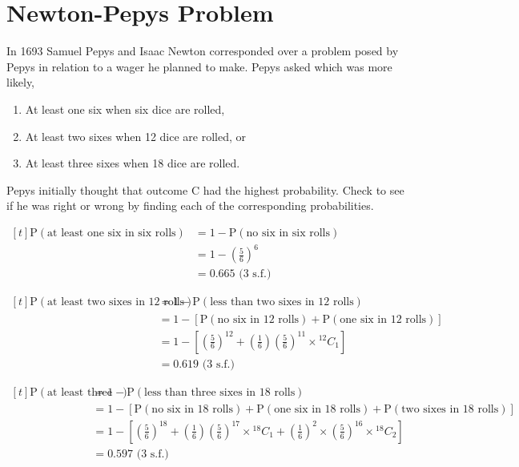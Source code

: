 \documentclass[11pt,a4paper]{book}
\begin{document}
\section{Newton-Pepys Problem}

\begin{example}

In 1693 Samuel Pepys and Isaac Newton corresponded over a problem
posed by Pepys in relation to a wager he planned to make. Pepys asked
which was more likely,

\begin{enumerate}[label=\Alph*:]

\item At least one six when six dice are rolled,

\item At least two sixes when 12 dice are rolled, or

\item At least three sixes when 18 dice are rolled.

\end{enumerate}

Pepys initially thought that outcome C had the highest probability.
Check to see if he was right or wrong by finding each of the corresponding
probabilities.

\Solution

$
\begin{aligned}[t]
\text{P}\left(\text{at least one six in six rolls}\right) & =1-\text{P}\left(\text{no six in six rolls}\right)\\
 & =1-\left(\frac{5}{6}\right)^{6}\\
 & =0.665\text{ (3 s.f.)}
\end{aligned}
$

$
\begin{aligned}[t]
\text{P}\left(\text{at least two sixes in 12 rolls}\right) & =1-\text{P}\left(\text{less than two sixes in 12 rolls}\right)\\
 & =1-\left[\text{P}\left(\text{no six in 12 rolls}\right)+\text{P}\left(\text{one six in 12 rolls}\right)\right]\\
 & =1-\left[\left(\frac{5}{6}\right)^{12}+\left(\frac{1}{6}\right)\left(\frac{5}{6}\right)^{11}\times{}^{12}C_{1}\right]\\
 & =0.619\text{ (3 s.f.)}
\end{aligned}
$

$
\begin{aligned}[t]
\text{P}\left(\text{at least three sixes in 18 rolls}\right) & =1-\text{P}\left(\text{less than three sixes in 18 rolls}\right)\\
 & =1-\left[\text{P}\left(\text{no six in 18 rolls}\right)+\text{P}\left(\text{one six in 18 rolls}\right)+\text{P}\left(\text{two sixes in 18 rolls}\right)\right]\\
 & =1-\left[\left(\frac{5}{6}\right)^{18}+\left(\frac{1}{6}\right)\left(\frac{5}{6}\right)^{17}\times{}^{18}C_{1}+\left(\frac{1}{6}\right)^{2}\times\left(\frac{5}{6}\right)^{16}\times{}^{18}C_{2}\right]\\
 & =0.597\text{ (3 s.f.)}
\end{aligned}
$

\end{example}
\end{document}
